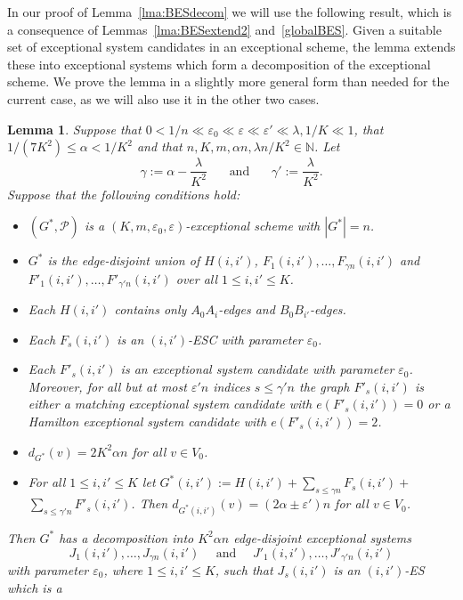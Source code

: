 \documentclass{memo-l}
\newtheorem{lemma}[firstthm]{Lemma}
\def\cP{\mathcal{P}}
\def\eps{\varepsilon}
\def\epszero{\eps_0}
\numberwithin{section}{chapter}
\numberwithin{equation}{section}
\numberwithin{firstthm}{section}
\numberwithin{figure}{section}
\begin{document}
{In our proof of Lemma~\ref{lma:BESdecom} we will use the following result, which is a consequence of
Lemmas~\ref{lma:BESextend2} and~\ref{globalBES}. 
Given a suitable set of exceptional system candidates in an exceptional scheme, the lemma extends these into exceptional systems which form a
decomposition of the exceptional scheme.
We prove the lemma in a slightly more general form than needed for the current case, 
as we will also use it 
in the other two cases.

\begin{lemma} \label{BEScons}
Suppose that $0 <  1/n  \ll \epszero \ll \eps\ll \eps' \ll \lambda, 1/K \ll  1$, that $1/(7K^2)\le \alpha < 1/K^2$
and that $n, K,m,\alpha n,\lambda n/K^2  \in \mathbb{N}$.
Let $$\gamma:=\alpha -\frac{\lambda}{K^2}\ \ \ \ \ \ \ \ \text{and} \ \ \ \ \ \ \ \ \gamma':=\frac{\lambda}{K^2}.$$
Suppose that the following conditions hold:
\begin{itemize}
\item[{\rm (i)}] $(G^*,\cP)$ is a $(K,m,\eps_0,\eps)$-exceptional scheme with $|G^*|=n$.
\item[{\rm (ii)}] $G^*$ is the edge-disjoint union of $H(i,i')$, $F_1(i,i'),\dots,F_{\gamma n}(i,i')$ and\break $F'_1(i,i'),\dots,F'_{\gamma' n}(i,i')$
over all $1\le i,i'\le K$. 
\item[{\rm (iii)}] Each $H(i,i')$ contains only $A_0A_i$-edges and $B_0B_{i'}$-edges.
\item[{\rm (iv)}] Each $F_s(i,i')$ is an $(i,i')$-ESC with parameter $\eps_0$.
\item[{\rm (v)}] Each $F'_s(i,i')$ is an exceptional system candidate with parameter $\eps_0$.
Moreover, for all but at most $\eps' n$ indices $s\le \gamma' n$ the graph $F'_s(i,i')$ is either a
matching exceptional system candidate with $e(F'_s(i,i'))=0$ or a Hamilton exceptional system candidate with $e(F'_s(i,i'))=2$.
\item[{\rm (vi)}] $d_{G^*}(v)=2K^2\alpha n$ for all $v\in V_0$.
\item[{\rm (vii)}] For all $1\le i,i'\le K$ let $G^*(i,i'):=H(i,i')+\sum_{s\le \gamma n} F_s(i,i')+$ \\$\sum_{s\le \gamma' n} F'_s(i,i')$.
Then $d_{G^*(i,i')}(v)=(2\alpha \pm \eps')n$ for all $v\in V_0$.
\end{itemize}
Then $G^*$ has a decomposition into $K^2\alpha n$ edge-disjoint exceptional systems
$$J_1(i,i'),\dots,J_{\gamma n}(i,i') \ \ \ \ \ \ \text{and} \ \ \ \ \ \ J'_1(i,i'),\dots,J'_{\gamma' n}(i,i')$$
with parameter $\eps_0$, where $1\le i,i'\le K$, such that $J_s(i,i')$ is an $(i,i')$-ES which is a

\end{lemma}}
\end{document}
